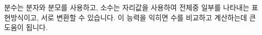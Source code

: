 \documentclass[12pt]{book}
\begin{document}
  분수는 분자와 분모를 사용하고, 소수는 자리값을 사용하여 전체중 일부를 나타내는 
  표현방식이고, 서로 변환할 수 있습니다. 이 능력을 익히면 수를 비교하고 계산하는데 
  큰 도움이 됩니다.


  \twosidedpaper
\end{document}
